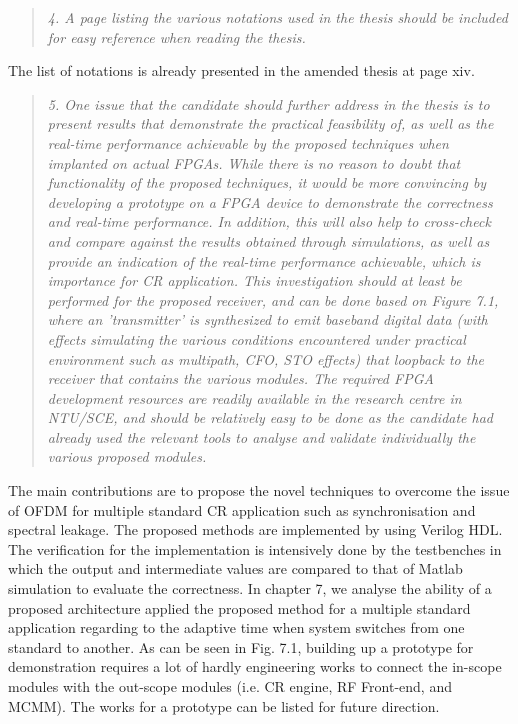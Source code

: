 \documentclass{article}
\begin{document}
\begin{quote}
\emph{4. A page listing the various notations used in the thesis should be included for easy reference when reading the thesis.}
\end{quote}
The list of notations is already presented in the amended thesis at page xiv.

\begin{quote}
\emph{5. One issue that the candidate should further address in the thesis is to present results that demonstrate the practical feasibility of, as well as the real-time performance achievable by the proposed techniques when implanted on actual FPGAs. While there is no reason to doubt that functionality of the proposed techniques, it would be more convincing by developing a prototype on a FPGA device to demonstrate the correctness and real-time performance. In addition, this will also help to cross-check and compare against the results obtained through simulations, as well as provide an indication of the real-time performance achievable, which is importance for CR application. This investigation should at least be performed for the proposed receiver, and can be done based on Figure 7.1, where an 'transmitter' is synthesized to emit baseband digital data (with effects simulating the various conditions encountered under practical environment such as multipath, CFO, STO effects) that loopback to the receiver that contains the various modules. The required FPGA development resources are readily available in the research centre in NTU/SCE, and should be relatively easy to be done as the candidate had already used the relevant tools to analyse and validate individually the various proposed modules.}
\end{quote}
The main contributions are to propose the novel techniques to overcome the issue of OFDM for multiple standard CR application such as synchronisation and spectral leakage. The proposed methods are implemented by using Verilog HDL. The verification for the implementation is intensively done by the testbenches in which the output and intermediate values are compared to that of Matlab simulation to evaluate the correctness. In chapter 7, we analyse the ability of a proposed architecture applied the proposed method for a multiple standard application regarding to the adaptive time when system switches from one standard to another. As can be seen in Fig. 7.1, building up a prototype for demonstration requires a lot of hardly engineering works to connect the in-scope modules with the out-scope modules (i.e. CR engine, RF Front-end, and MCMM). The works for a prototype can be listed for future direction.
\end{document}
